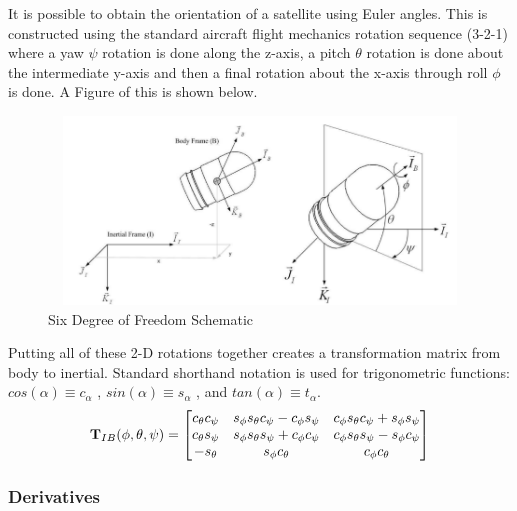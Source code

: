 \documentclass{article}
\begin{document}
It is possible to obtain the orientation of a satellite using Euler
angles. This is constructed using the standard aircraft flight mechanics rotation
sequence (3-2-1) where a yaw $\psi$ rotation is done along the z-axis,
a pitch $\theta$ rotation is done about the intermediate y-axis and
then a final rotation about the x-axis through roll $\phi$ is
done. A Figure of this is shown below.
\begin{figure}[H]
  \begin{center}
  \includegraphics[height=50mm, width=120mm]{Figures/6DOFrocketschematic.png}
  \end{center}
  \caption{Six Degree of Freedom Schematic}
\end{figure}
Putting all of these 2-D rotations together creates a
transformation matrix from body to inertial. Standard shorthand
notation is used for trigonometric functions: $ cos(\alpha) \equiv
c_{\alpha} $ , $ sin(\alpha) \equiv s_{\alpha} $ , and $ tan(\alpha)
\equiv t_{\alpha} $.
\begin{equation}\label{e:TIB}
{\bf T}_{IB}(\phi,\theta,\psi) = \begin{bmatrix} c_{\theta}c_{\psi} &
s_{\phi}s_{\theta}c_{\psi}-c_{\phi}s_{\psi} &
c_{\phi}s_{\theta}c_{\psi} + s_{\phi}s_{\psi} \\ c_{\theta}s_{\psi} &
s_{\phi}s_{\theta}s_{\psi} + c_{\phi}c_{\psi} &
c_{\phi}s_{\theta}s_{\psi} - s_{\phi}c_{\psi} \\
-s_{\theta} & s_{\phi}c_{\theta} & c_{\phi}c_{\theta}
\end{bmatrix}
\end{equation}

\subsubsection{Derivatives}
\end{document}
